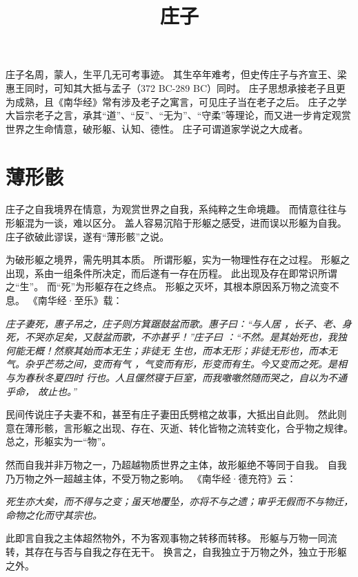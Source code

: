 \documentclass[11pt]{article}
\title{庄子}
\date{}
\begin{document}
  \maketitle

  \linenumbers

庄子名周，蒙人，生平几无可考事迹。
其生卒年难考，但史传庄子与齐宣王、梁惠王同时，可知其大抵与孟子（372 BC-289 BC）同时。
庄子思想承接老子且更为成熟，且《南华经》常有涉及老子之寓言，可见庄子当在老子之后。
庄子之学大旨宗老子之言，承其“道”、“反”、“无为”、“守柔”等理论，而又进一步肯定观赏世界之生命情意，破形躯、认知、德性。
庄子可谓道家学说之大成者。

\section{薄形骸}
庄子之自我境界在情意，为观赏世界之自我，系纯粹之生命境趣。
而情意往往与形躯混为一谈，难以区分。
盖人容易沉陷于形躯之感受，进而误以形躯为自我。
庄子欲破此谬误，遂有“薄形骸”之说。

\par

为破形躯之境界，需先明其本质。
所谓形躯，实为一物理性存在之过程。
形躯之出现，系由一组条件所决定，而后遂有一存在历程。
此出现及存在即常识所谓之“生”。
而“死”为形躯存在之终点。
形躯之灭坏，其根本原因系万物之流变不息。
《南华经·至乐》载：

\textit{庄子妻死，惠子吊之，庄子则方箕踞鼓盆而歌。惠子曰：“与人居 ，长子、老、身死，不哭亦足矣，又鼓盆而歌，不亦甚乎！”庄子曰 ：“不然。是其始死也，我独何能无概！然察其始而本无生；非徒无 生也，而本无形；非徒无形也，而本无气。杂乎芒芴之间，变而有气 ，气变而有形，形变而有生。今又变而之死。是相与为春秋冬夏四时 行也。人且偃然寝于巨室，而我噭噭然随而哭之，自以为不通乎命， 故止也。”}

民间传说庄子夫妻不和，甚至有庄子妻田氏劈棺之故事，大抵出自此则。
然此则意在薄形骸，言形躯之出现、存在、灭逝、转化皆物之流转变化，合乎物之规律。
总之，形躯实为一“物”。

\par

然而自我并非万物之一，乃超越物质世界之主体，故形躯绝不等同于自我。
自我乃万物之外一超越主体，不受万物之影响。
《南华经·德充符》云：

\textit{死生亦大矣，而不得与之变；虽天地覆坠，亦将不与之遗；审乎无假而不与物迁，命物之化而守其宗也。}

此即言自我之主体超然物外，不为客观事物之转移而转移。
形躯与万物一同流转，其存在与否与自我之存在无干。
换言之，自我独立于万物之外，独立于形躯之外。
\end{document}
